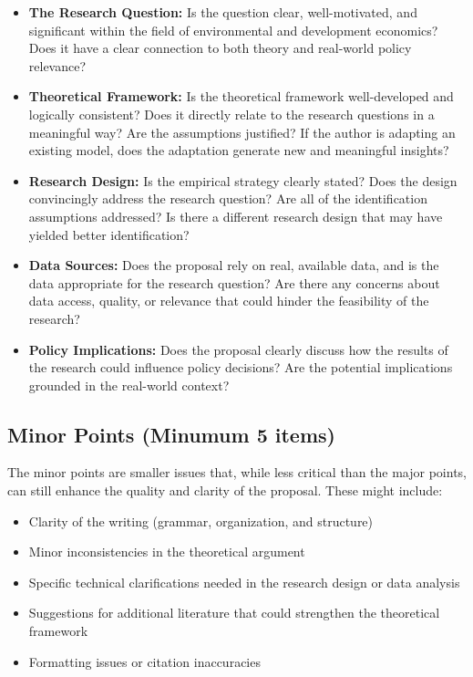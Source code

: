 \documentclass[
]{article}
\providecommand{\tightlist}{%
  \setlength{\itemsep}{0pt}\setlength{\parskip}{0pt}}
\begin{document}
\begin{itemize}
\item
  \textbf{The Research Question:} Is the question clear, well-motivated, and significant within the field of environmental and development economics? Does it have a clear connection to both theory and real-world policy relevance?
\item
  \textbf{Theoretical Framework:} Is the theoretical framework well-developed and logically consistent? Does it directly relate to the research questions in a meaningful way? Are the assumptions justified? If the author is adapting an existing model, does the adaptation generate new and meaningful insights?
\item
  \textbf{Research Design:} Is the empirical strategy clearly stated? Does the design convincingly address the research question? Are all of the identification assumptions addressed? Is there a different research design that may have yielded better identification?
\item
  \textbf{Data Sources:} Does the proposal rely on real, available data, and is the data appropriate for the research question? Are there any concerns about data access, quality, or relevance that could hinder the feasibility of the research?
\item
  \textbf{Policy Implications:} Does the proposal clearly discuss how the results of the research could influence policy decisions? Are the potential implications grounded in the real-world context?
\end{itemize}

\hypertarget{minor-points-minumum-5-items}{%
\subsection{Minor Points (Minumum 5 items)}\label{minor-points-minumum-5-items}}

The minor points are smaller issues that, while less critical than the major points, can still enhance the quality and clarity of the proposal. These might include:

\begin{itemize}
\tightlist
\item
  Clarity of the writing (grammar, organization, and structure)
\item
  Minor inconsistencies in the theoretical argument
\item
  Specific technical clarifications needed in the research design or data analysis
\item
  Suggestions for additional literature that could strengthen the theoretical framework
\item
  Formatting issues or citation inaccuracies
\end{itemize}
\end{document}
